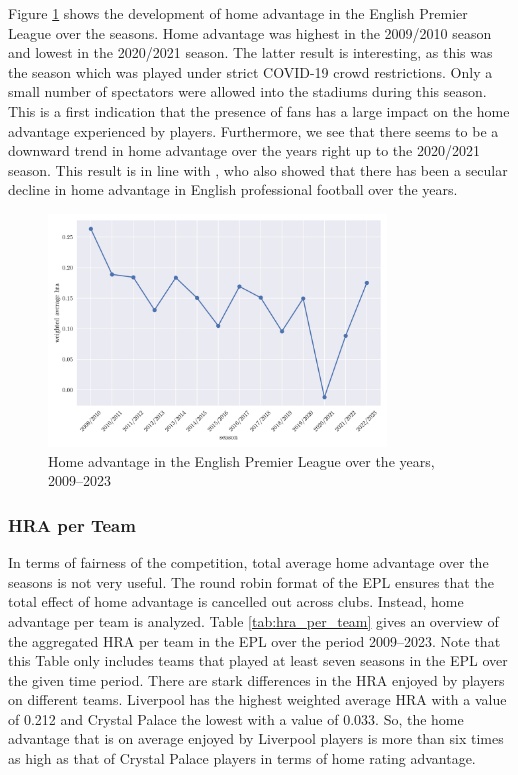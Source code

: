 \noindent
Figure \ref{fig:hra_over_the_seasons} shows the development of home advantage in the English Premier League over the seasons. Home advantage was highest in the 2009/2010 season and lowest in the 2020/2021 season. The latter result is interesting, as this was the season which was played under strict COVID-19 crowd restrictions. Only a small number of spectators were allowed into the stadiums during this season. This is a first indication that the presence of fans has a large impact on the home advantage experienced by players. Furthermore, we see that there seems to be a downward trend in home advantage over the years right up to the 2020/2021 season. This result is in line with , who also showed that there has been a secular decline in home advantage in English professional football over the years.

\begin{figure}[htbp]
    \centering
    \includegraphics[width=0.8\textwidth]{attachments/average_hra_per_season.png}
    \caption{Home advantage in the English Premier League over the years, 2009--2023}
    \label{fig:hra_over_the_seasons}
\end{figure}

\subsubsection{HRA per Team}
In terms of fairness of the competition, total average home advantage over the seasons is not very useful. The round robin format of the EPL ensures that the total effect of home advantage is cancelled out across clubs. Instead, home advantage per team is analyzed. Table \ref{tab:hra_per_team} gives an overview of the aggregated HRA per team in the EPL over the period 2009--2023. Note that this Table only includes teams that played at least seven seasons in the EPL over the given time period. There are stark differences in the HRA enjoyed by players on different teams. Liverpool has the highest weighted average HRA with a value of 0.212 and Crystal Palace the lowest with a value of 0.033. So, the home advantage that is on average enjoyed by Liverpool players is more than six times as high as that of Crystal Palace players in terms of home rating advantage.

